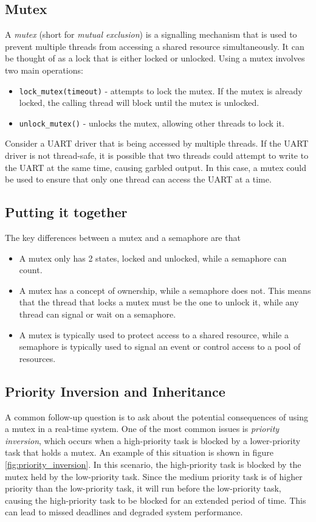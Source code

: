 \documentclass[main.tex]{subfiles}
\begin{document}
\subsection{Mutex}
A \textit{mutex} (short for \textit{mutual exclusion}) is a signalling mechanism that is used to prevent multiple threads from accessing a shared resource simultaneously. It can be thought of as a lock that is either locked or unlocked.
\newline
\newline
\noindent Using a mutex involves two main operations: \begin{itemize}
    \item \texttt{lock\_mutex(timeout)} - attempts to lock the mutex. If the mutex is already locked, the calling thread will block until the mutex is unlocked.
    \item \texttt{unlock\_mutex()} - unlocks the mutex, allowing other threads to lock it.
\end{itemize}

\noindent Consider a UART driver that is being accessed by multiple threads. If the UART driver is not thread-safe, it is possible that two threads could attempt to write to the UART at the same time, causing garbled output. In this case, a mutex could be used to ensure that only one thread can access the UART at a time.

\subsection{Putting it together}
The key differences between a mutex and a semaphore are that
\begin{itemize}
    \item A mutex only has 2 states, locked and unlocked, while a semaphore can count.
    \item A mutex has a concept of ownership, while a semaphore does not. This means that the thread that locks a mutex must be the one to unlock it, while any thread can signal or wait on a semaphore.
    \item A mutex is typically used to protect access to a shared resource, while a semaphore is typically used to signal an event or control access to a pool of resources.
\end{itemize}

\subsection{Priority Inversion and Inheritance}
A common follow-up question is to ask about the potential consequences of using a mutex in a real-time system. One of the most common issues is \textit{priority inversion}, which occurs when a high-priority task is blocked by a lower-priority task that holds a mutex. An example of this situation is shown in figure \ref{fig:priority_inversion}. In this scenario, the high-priority task is blocked by the mutex held by the low-priority task. Since the medium priority task is of higher priority than the low-priority task, it will run before the low-priority task, causing the high-priority task to be blocked for an extended period of time. This can lead to missed deadlines and degraded system performance.
\end{document}
